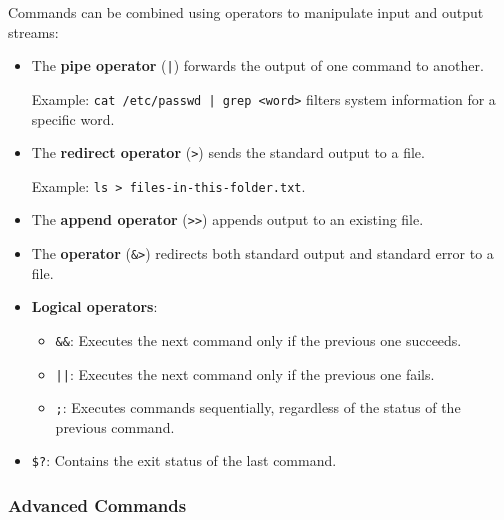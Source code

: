Commands can be combined using operators to manipulate input and output streams:
\begin{itemize}
    \item The \textbf{pipe operator} (\texttt{|}) forwards the output of one command to another.
    
    Example: \texttt{cat /etc/passwd | grep <word>} filters system information for a specific word.
    
    \item The \textbf{redirect operator} (\texttt{>}) sends the standard output to a file.
    
    Example: \texttt{ls > files-in-this-folder.txt}.
    
    \item The \textbf{append operator} (\texttt{>>}) appends output to an existing file.
    \item The \textbf{operator} (\texttt{\&>}) redirects both standard output and standard error to a file.
    \item \textbf{Logical operators}:
    \begin{itemize}
        \item \texttt{\&\&}: Executes the next command only if the previous one succeeds.
        \item \texttt{||}: Executes the next command only if the previous one fails.
        \item \texttt{;}: Executes commands sequentially, regardless of the status of the previous command.
    \end{itemize}
    \item \texttt{\$?}: Contains the exit status of the last command.
\end{itemize}

\subsubsection{Advanced Commands}

\vspace{-1em}



